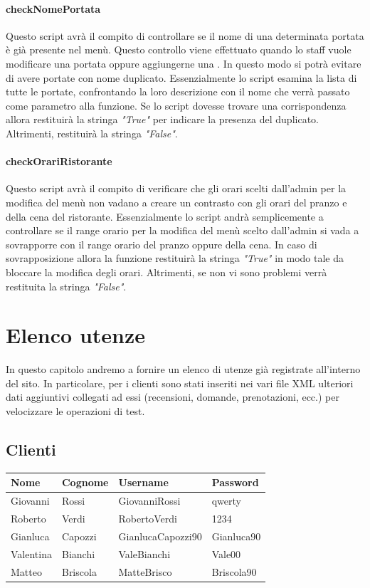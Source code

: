 \documentclass [a4paper, 12pt]{book}
\begin{document}
\subsubsection{checkNomePortata}
Questo script avrà il compito di controllare se il nome di una determinata portata è già presente nel menù. Questo controllo viene effettuato quando lo staff vuole modificare una portata oppure aggiungerne una . In questo modo si potrà evitare di avere portate con nome duplicato. Essenzialmente lo script esamina la lista di tutte le portate, confrontando la loro descrizione con il nome che verrà passato come parametro alla funzione. Se lo script dovesse trovare una corrispondenza allora restituirà la stringa \textit{"True"} per indicare la presenza del duplicato. Altrimenti, restituirà la stringa \textit{"False"}.

\subsubsection{checkOrariRistorante}
Questo script avrà il compito di verificare che gli orari scelti dall'admin per la modifica del menù non vadano a creare un contrasto con gli orari del pranzo e della cena del ristorante. Essenzialmente lo script andrà semplicemente a controllare se il range orario per la modifica del menù scelto dall'admin si vada a sovrapporre con il range orario del pranzo oppure della cena. In caso di sovrapposizione allora la funzione restituirà la stringa \textit{"True"} in modo tale da bloccare la modifica degli orari. Altrimenti, se non vi sono problemi verrà restituita la stringa \textit{"False"}.


\chapter{Elenco utenze}
In questo capitolo andremo a fornire un elenco di utenze già registrate all'interno del sito. In particolare, per i clienti sono stati inseriti nei vari file XML ulteriori dati aggiuntivi collegati ad essi (recensioni, domande, prenotazioni, ecc.) per velocizzare le operazioni di test.

\section{Clienti}
\begin{table}[h]
\centering
\begin{tabular}{|l|l|l|l|}
\hline
\textbf{Nome} & \textbf{Cognome} & \textbf{Username} & \textbf{Password}\\
\hline
Giovanni & Rossi & GiovanniRossi & qwerty\\
\hline
Roberto & Verdi & RobertoVerdi & 1234\\
\hline
Gianluca & Capozzi & GianlucaCapozzi90 & Gianluca90\\
\hline
Valentina & Bianchi & ValeBianchi & Vale00\\
\hline
Matteo & Briscola & MatteBrisco & Briscola90\\
\hline
\end{tabular}

\end{table}
\end{document}
